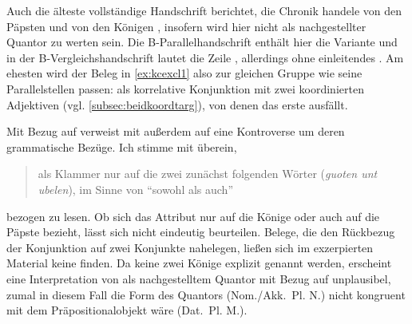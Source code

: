 Auch die älteste vollständige Handschrift \autocite{kc:A1} berichtet, die
Chronik handele von den Päpsten und von den Königen 
 \autocites[1\ra,
18]{kc:A1}[vgl.][20]{schroeder1895}, insofern wird  hier nicht als
nachgestellter Quantor zu werten sein. Die
B-\allowbreak{}Pa\-ral\-lel\-hand\-schrift \citet{kc:P} enthält hier die
Variante   \autocite[\pno~1\ra, 10]{kc:P} und in der
B-Vergleichshandschrift \citet{kc:VB} lautet die Zeile  , allerdings ohne einleitendes
 \autocite[\pno~1\ra, 18]{kc:VB}. Am ehesten wird der Beleg in \cref{ex:kcexcl1} also
zur gleichen Gruppe wie seine Parallelstellen passen:  als
korrelative Konjunktion mit zwei koordinierten Adjektiven (vgl.
\cref{subsec:beidkoordtarg}), von denen das erste ausfällt.

Mit Bezug auf  verweist \citet[26,
Anm.~45]{weis2022} mit \citet[55, Anm.~87]{dickhutbielsky2015} außerdem auf
eine Kontroverse um deren grammatische Bezüge. Ich stimme mit \citet{haupt2019}
überein,  \blockcquote[239]{haupt2019}{als Klammer
nur auf die zwei zunächst folgenden Wörter (\textit{guoten unt ubelen}), im
Sinne von \enquote{sowohl als auch}} bezogen zu lesen. Ob sich das Attribut
  nur auf
die Könige oder auch auf die Päpste bezieht, lässt sich nicht eindeutig
beurteilen. Belege, die den Rückbezug der Konjunktion  auf zwei
Konjunkte nahelegen, ließen sich im exzerpierten Material keine finden. Da
keine zwei Könige explizit genannt werden, erscheint eine Interpretation von
 als nachgestelltem Quantor mit Bezug auf 
 unplausibel, zumal in diesem Fall die Form des Quantors
(Nom./Akk.~Pl. N.) nicht kongruent mit dem Präpositionalobjekt wäre (Dat.~Pl.
M.).


